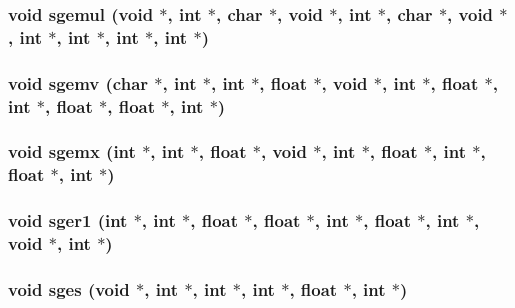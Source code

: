 \subsubsection{\setlength{\rightskip}{0pt plus 5cm}void sgemul (void $\ast$, int $\ast$, char $\ast$, void $\ast$, int $\ast$, char $\ast$, void $\ast$, int $\ast$, int $\ast$, int $\ast$, int $\ast$)}\label{essl_8h_9ed83c87976b3bdbe8097d5235d7af7f}


\subsubsection{\setlength{\rightskip}{0pt plus 5cm}void sgemv (char $\ast$, int $\ast$, int $\ast$, float $\ast$, void $\ast$, int $\ast$, float $\ast$, int $\ast$, float $\ast$, float $\ast$, int $\ast$)}\label{essl_8h_43bc6bacfe8dc79ec1a223efbea84aed}


\subsubsection{\setlength{\rightskip}{0pt plus 5cm}void sgemx (int $\ast$, int $\ast$, float $\ast$, void $\ast$, int $\ast$, float $\ast$, int $\ast$, float $\ast$, int $\ast$)}\label{essl_8h_4974006b52c69123bdd8ab50a97e9b08}


\subsubsection{\setlength{\rightskip}{0pt plus 5cm}void sger1 (int $\ast$, int $\ast$, float $\ast$, float $\ast$, int $\ast$, float $\ast$, int $\ast$, void $\ast$, int $\ast$)}\label{essl_8h_f4aafc932e0745543785a8351eb1d49c}


\subsubsection{\setlength{\rightskip}{0pt plus 5cm}void sges (void $\ast$, int $\ast$, int $\ast$, int $\ast$, float $\ast$, int $\ast$)}\label{essl_8h_042ab5e38017a4df8c828ee8a3a5befa}


